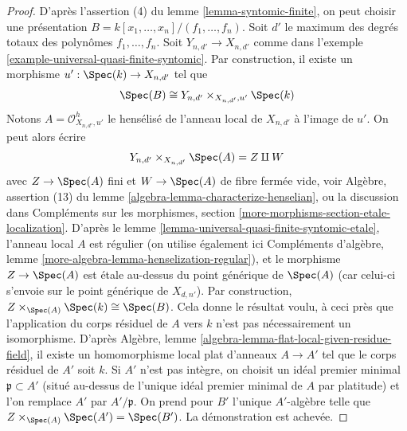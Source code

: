 \begin{proof}
\medskip\noindent
D'après l'assertion (4) du lemme \ref{lemma-syntomic-finite}, on peut choisir une présentation
$B = k[x_1, \ldots, x_n]/(f_1, \ldots, f_n)$.
Soit $d'$ le maximum des degrés totaux des polynômes $f_1, \ldots, f_n$.
Soit $Y_{n, d'} \to X_{n, d'}$ comme dans
l'exemple \ref{example-universal-quasi-finite-syntomic}.
Par construction, il existe un morphisme $u' : \Spec(k) \to X_{n, d'}$
tel que
$$
\Spec(B) \cong Y_{n, d'} \times_{X_{n, d'}, u'} \Spec(k)
$$
Notons $A = \mathcal{O}_{X_{n, d'}, u'}^h$ le hensélisé de
l'anneau local de $X_{n, d'}$ à l'image de $u'$. On peut alors écrire
$$
Y_{n, d'} \times_{X_{n, d'}} \Spec(A) = Z \amalg W
$$
avec $Z \to \Spec(A)$ fini et $W \to \Spec(A)$ de fibre
fermée vide, voir
Algèbre, assertion (13) du lemme \ref{algebra-lemma-characterize-henselian},
ou la discussion dans Compléments sur les morphismes, section
\ref{more-morphisms-section-etale-localization}.
D'après le lemme \ref{lemma-universal-quasi-finite-syntomic-etale},
l'anneau local $A$ est régulier (on utilise également ici
Compléments d'algèbre, lemme \ref{more-algebra-lemma-henselization-regular}),
et le morphisme $Z \to \Spec(A)$ est étale au-dessus du point générique de
$\Spec(A)$ (car celui-ci s'envoie sur le point générique de $X_{d, n'}$).
Par construction, $Z \times_{\Spec(A)} \Spec(k) \cong \Spec(B)$.
Cela donne le résultat voulu, à ceci près que l'application du
corps résiduel de $A$ vers $k$ n'est pas nécessairement un isomorphisme.
D'après Algèbre, lemme \ref{algebra-lemma-flat-local-given-residue-field},
il existe un homomorphisme local plat d'anneaux $A \to A'$ tel que le corps résiduel
de $A'$ soit $k$. Si $A'$ n'est pas intègre, on choisit un
idéal premier minimal $\mathfrak p \subset A'$ (situé au-dessus de
l'unique idéal premier minimal de $A$ par platitude) et l'on remplace
$A'$ par $A'/\mathfrak p$. On prend pour $B'$ l'unique $A'$-algèbre
telle que $Z \times_{\Spec(A)} \Spec(A') = \Spec(B')$.
La démonstration est achevée.
\end{proof}

